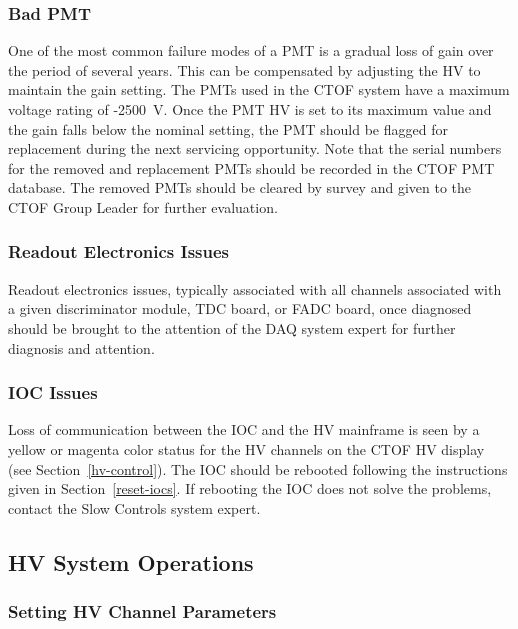 \documentclass[12pt]{article}
\begin{document}
\subsubsection{Bad PMT}
\label{bad-pmt}

One of the most common failure modes of a PMT is a gradual loss of gain over the period of several years. This
can be compensated by adjusting the HV to maintain the gain setting. The PMTs used in the CTOF system have a
maximum voltage rating of -2500~V. Once the PMT HV is set to its maximum value and the gain falls below the
nominal setting, the PMT should be flagged for replacement during the next servicing opportunity. Note that the
serial numbers for the removed and replacement PMTs should be recorded in the CTOF PMT database. The
removed PMTs should be cleared by survey and given to the CTOF Group Leader for further evaluation.

\subsubsection{Readout Electronics Issues}
\label{readout-issues}

Readout electronics issues, typically associated with all channels associated with a given discriminator module,
TDC board, or FADC board, once diagnosed should be brought to the attention of the DAQ system expert for
further diagnosis and attention.

\subsubsection{IOC Issues}
\label{ioc-issues}

Loss of communication between the IOC and the HV mainframe is seen by a yellow or magenta color status for the
HV channels on the CTOF HV display (see Section~\ref{hv-control}). The IOC should be rebooted following the
instructions given in Section~\ref{reset-iocs}. If rebooting the IOC does not solve the problems, contact the
Slow Controls system expert.

\subsection{HV System Operations}

\subsubsection{Setting HV Channel Parameters}
\label{hv-parms}
\end{document}
